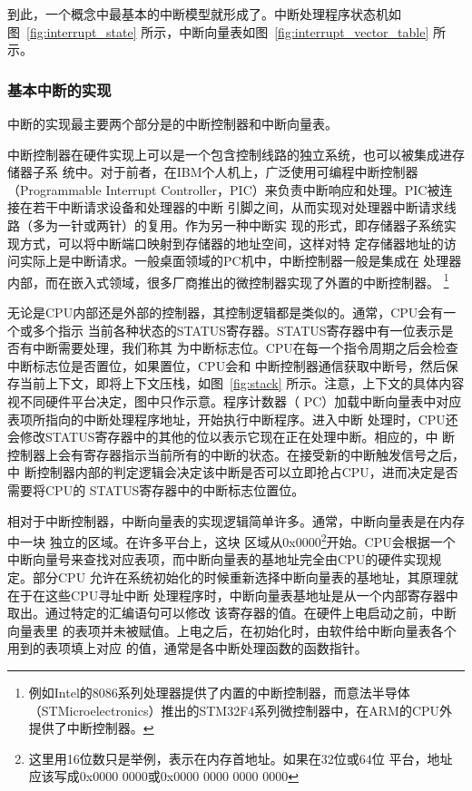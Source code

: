到此，一个概念中最基本的中断模型就形成了。中断处理程序状态机如图~\ref{fig:interrupt_state} 
所示，中断向量表如图~\ref{fig:interrupt_vector_table} 所示。

\subsubsection{基本中断的实现}
\label{subsec:basic_hardware}

中断的实现最主要两个部分是的中断控制器和中断向量表。

中断控制器在硬件实现上可以是一个包含控制线路的独立系统，也可以被集成进存储器子系
统中。对于前者，在IBM个人机上，广泛使用可编程中断控制器（Programmable Interrupt 
Controller，PIC）来负责中断响应和处理。PIC被连接在若干中断请求设备和处理器的中断
引脚之间，从而实现对处理器中断请求线路（多为一针或两针）的复用。作为另一种中断实
现的形式，即存储器子系统实现方式，可以将中断端口映射到存储器的地址空间，这样对特
定存储器地址的访问实际上是中断请求。一般桌面领域的PC机中，中断控制器一般是集成在
处理器内部，而在嵌入式领域，很多厂商推出的微控制器实现了外置的中断控制器。
\footnote{例如Intel的8086系列处理器提供了内置的中断控制器，而意法半导体
（STMicroelectronics）推出的STM32F4系列微控制器中，在ARM的CPU外提供了中断控制器。}

无论是CPU内部还是外部的控制器，其控制逻辑都是类似的。通常，CPU会有一个或多个指示
当前各种状态的STATUS寄存器。STATUS寄存器中有一位表示是否有中断需要处理，我们称其
为中断标志位。CPU在每一个指令周期之后会检查中断标志位是否置位，如果置位，CPU会和
中断控制器通信获取中断号，然后保存当前上下文，即将上下文压栈，如图~\ref{fig:stack} 
所示。注意，上下文的具体内容视不同硬件平台决定，图中只作示意。程序计数器（
PC）加载中断向量表中对应表项所指向的中断处理程序地址，开始执行中断程序。进入中断
处理时，CPU还会修改STATUS寄存器中的其他的位以表示它现在正在处理中断。相应的，中
断控制器上会有寄存器指示当前所有的中断的状态。在接受新的中断触发信号之后，中
断控制器内部的判定逻辑会决定该中断是否可以立即抢占CPU，进而决定是否需要将CPU的
STATUS寄存器中的中断标志位置位。

相对于中断控制器，中断向量表的实现逻辑简单许多。通常，中断向量表是在内存中一块
独立的区域。在许多平台上，这块
区域从0x0000\footnote{这里用16位数只是举例，表示在内存首地址。如果在32位或64位
平台，地址应该写成0x0000 0000或0x0000 0000 0000 0000}开始。CPU会根据一个
中断向量号来查找对应表项，而中断向量表的基地址完全由CPU的硬件实现规定。部分CPU
允许在系统初始化的时候重新选择中断向量表的基地址，其原理就在于在这些CPU寻址中断
处理程序时，中断向量表基地址是从一个内部寄存器中取出。通过特定的汇编语句可以修改
该寄存器的值。在硬件上电启动之前，中断向量表里
的表项并未被赋值。上电之后，在初始化时，由软件给中断向量表各个用到的表项填上对应
的值，通常是各中断处理函数的函数指针。

